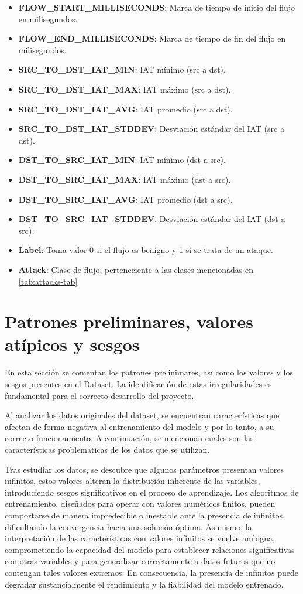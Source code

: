 \begin{itemize}
    \item \textbf{FLOW\_START\_MILLISECONDS}: Marca de tiempo de inicio del flujo en milisegundos.
    \item \textbf{FLOW\_END\_MILLISECONDS}: Marca de tiempo de fin del flujo en milisegundos.
    \item \textbf{SRC\_TO\_DST\_IAT\_MIN}: IAT mínimo (src a dst).
    \item \textbf{SRC\_TO\_DST\_IAT\_MAX}: IAT máximo (src a dst).
    \item \textbf{SRC\_TO\_DST\_IAT\_AVG}: IAT promedio (src a dst).
    \item \textbf{SRC\_TO\_DST\_IAT\_STDDEV}: Desviación estándar del IAT (src a dst).
    \item \textbf{DST\_TO\_SRC\_IAT\_MIN}: IAT mínimo (dst a src).
    \item \textbf{DST\_TO\_SRC\_IAT\_MAX}: IAT máximo (dst a src).
    \item \textbf{DST\_TO\_SRC\_IAT\_AVG}: IAT promedio (dst a src).
    \item \textbf{DST\_TO\_SRC\_IAT\_STDDEV}: Desviación estándar del IAT (dst a src).
    \item \textbf{Label}: Toma valor 0 si el flujo es benigno y 1 si se trata de un ataque.
    \item \textbf{Attack}: Clase de flujo, perteneciente a las clases mencionadas en \ref{tab:attacks-tab} 
\end{itemize}

\section{Patrones preliminares, valores atípicos y sesgos} \label{sec.segos-datos}
En esta sección se comentan los patrones prelinimares, así como los valores y los sesgos presentes en el Dataset. La identificación de estas irregularidades es fundamental para el correcto desarrollo del proyecto.

Al analizar los datos originales del dataset, se encuentran características que afectan de forma negativa al entrenamiento del modelo y por lo tanto, a su correcto funcionamiento. A continuación, se mencionan cuales son las características problematicas de los datos que se utilizan.


Tras estudiar los datos, se descubre que algunos parámetros presentan valores infinitos, estos valores alteran la distribución inherente de las variables, introduciendo sesgos significativos en el proceso de aprendizaje. Los algoritmos de entrenamiento, diseñados para operar con valores numéricos finitos, pueden comportarse de manera impredecible o inestable ante la presencia de infinitos, dificultando la convergencia hacia una solución óptima. Asimismo, la interpretación de las características con valores infinitos se vuelve ambigua, comprometiendo la capacidad del modelo para establecer relaciones significativas con otras variables y para generalizar correctamente a datos futuros que no contengan tales valores extremos. En consecuencia, la presencia de infinitos puede degradar sustancialmente el rendimiento y la fiabilidad del modelo entrenado.

